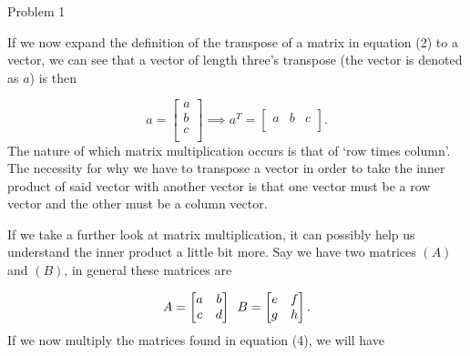 \begin{problem}{Problem 1}
\begin{highlight}
        If we now expand the definition of the transpose of a matrix in equation (2) to a vector, we can see that a vector of length three's transpose (the vector is denoted as $a$) is then

        \begin{equation}
            a = 
            \begin{bmatrix}
                a \\
                b \\
                c \\
            \end{bmatrix}
            \implies
            a^{T} = 
            \begin{bmatrix}
                a & b & c \\
            \end{bmatrix}.
        \end{equation}
        The nature of which matrix multiplication occurs is that of `row times column'. The necessity for why we have to transpose a vector in order to take the inner product of said vector with
        another vector is that one vector must be a row vector and the other must be a column vector.

        If we take a further look at matrix multiplication, it can possibly help us understand the inner product a little bit more. Say we have two matrices $(A)$ and $(B)$, in general these matrices
        are

        \begin{equation}
            A = 
            \begin{bmatrix}
                a & b \\
                c & d \\
            \end{bmatrix}
            \hspace*{5pt}
            B = 
            \begin{bmatrix}
                e & f \\
                g & h \\
            \end{bmatrix}.
        \end{equation}
        If we now multiply the matrices found in equation (4), we will have


\end{highlight}
\end{problem}
